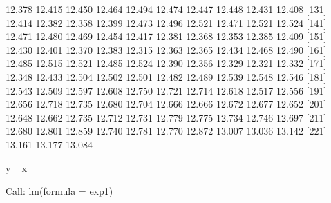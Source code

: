 \documentclass[a4paper,11pt]{scrartcl}
\begin{document}
\begin{Schunk}
\begin{Soutput}
[121] 12.378 12.415 12.450 12.464 12.494 12.474 12.447 12.448 12.431 12.408
[131] 12.414 12.382 12.358 12.399 12.473 12.496 12.521 12.471 12.521 12.524
[141] 12.471 12.480 12.469 12.454 12.417 12.381 12.368 12.353 12.385 12.409
[151] 12.430 12.401 12.370 12.383 12.315 12.363 12.365 12.434 12.468 12.490
[161] 12.485 12.515 12.521 12.485 12.524 12.390 12.356 12.329 12.321 12.332
[171] 12.348 12.433 12.504 12.502 12.501 12.482 12.489 12.539 12.548 12.546
[181] 12.543 12.509 12.597 12.608 12.750 12.721 12.714 12.618 12.517 12.556
[191] 12.656 12.718 12.735 12.680 12.704 12.666 12.666 12.672 12.677 12.652
[201] 12.648 12.662 12.735 12.712 12.731 12.779 12.775 12.734 12.746 12.697
[211] 12.680 12.801 12.859 12.740 12.781 12.770 12.872 13.007 13.036 13.142
[221] 13.161 13.177 13.084
\end{Soutput}
\begin{Soutput}
y ~ x
\end{Soutput}
\begin{Soutput}
Call:
lm(formula = exp1)


\end{Soutput}
\end{Schunk}
\end{document}
